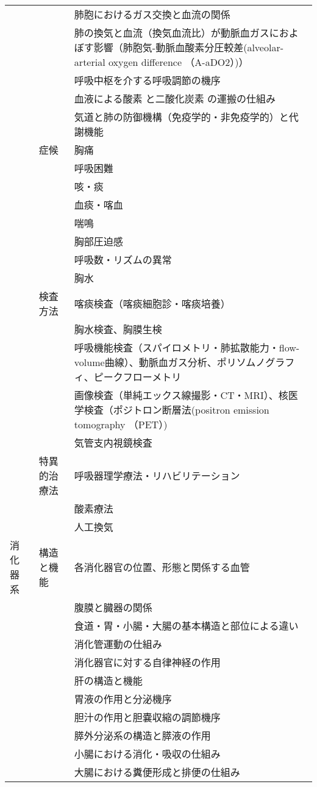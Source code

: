 \begin{xltabular}{\linewidth}{XXX}
 &  & 肺胞におけるガス交換と血流の関係 \\
 &  & 肺の換気と血流（換気血流比）が動脈血ガスにおよぼす影響（肺胞気-動脈血酸素分圧較差(alveolar-arterial oxygen difference （A-aDO2）)） \\
 &  & 呼吸中枢を介する呼吸調節の機序 \\
 &  & 血液による酸素 と二酸化炭素 の運搬の仕組み \\
 &  & 気道と肺の防御機構（免疫学的・非免疫学的）と代謝機能 \\
 & 症候 & 胸痛 \\
 &  & 呼吸困難 \\
 &  & 咳・痰 \\
 &  & 血痰・喀血 \\
 &  & 喘鳴 \\
 &  & 胸部圧迫感 \\
 &  & 呼吸数・リズムの異常 \\
 &  & 胸水 \\
 & 検査方法 & 喀痰検査（喀痰細胞診・喀痰培養） \\
 &  & 胸水検査、胸膜生検 \\
 &  & 呼吸機能検査（スパイロメトリ・肺拡散能力・flow-volume曲線）、動脈血ガス分析、ポリソムノグラフィ、ピークフローメトリ \\
 &  & 画像検査（単純エックス線撮影・CT・MRI）、核医学検査（ポジトロン断層法(positron emission tomography （PET）) \\
 &  & 気管支内視鏡検査 \\
 & 特異的治療法 & 呼吸器理学療法・リハビリテーション \\
 &  & 酸素療法 \\
 &  & 人工換気 \\
消化器系 & 構造と機能 & 各消化器官の位置、形態と関係する血管 \\
 &  & 腹膜と臓器の関係 \\
 &  & 食道・胃・小腸・大腸の基本構造と部位による違い \\
 &  & 消化管運動の仕組み \\
 &  & 消化器官に対する自律神経の作用 \\
 &  & 肝の構造と機能 \\
 &  & 胃液の作用と分泌機序 \\
 &  & 胆汁の作用と胆嚢収縮の調節機序 \\
 &  & 膵外分泌系の構造と膵液の作用 \\
 &  & 小腸における消化・吸収の仕組み \\
 &  & 大腸における糞便形成と排便の仕組み \\

\end{xltabular}
